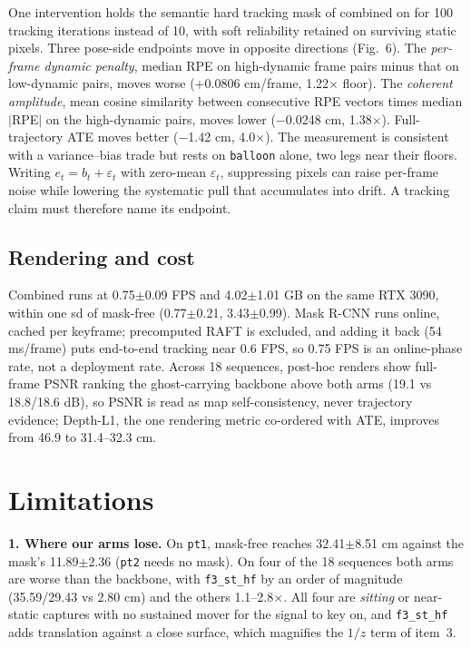 One intervention holds the semantic hard tracking mask of combined on for 100 tracking iterations instead of 10, with soft reliability retained on surviving static pixels. Three pose-side endpoints move in opposite directions (Fig.~6). The \emph{per-frame dynamic penalty}, median RPE on high-dynamic frame pairs minus that on low-dynamic pairs, moves worse (+0.0806 cm/frame, 1.22$\times$ floor). The \emph{coherent amplitude}, mean cosine similarity between consecutive RPE vectors times median $|$RPE$|$ on the high-dynamic pairs, moves lower ($-$0.0248 cm, 1.38$\times$). Full-trajectory ATE moves better ($-$1.42 cm, 4.0$\times$). The measurement is consistent with a variance--bias trade but rests on \texttt{balloon} alone, two legs near their floors. Writing $e_t=b_t+\varepsilon_t$ with zero-mean $\varepsilon_t$, suppressing pixels can raise per-frame noise while lowering the systematic pull that accumulates into drift. A tracking claim must therefore name its endpoint.


\subsection{Rendering and cost}


Combined runs at 0.75$\pm$0.09 FPS and 4.02$\pm$1.01 GB on the same RTX 3090, within one sd of mask-free (0.77$\pm$0.21, 3.43$\pm$0.99). Mask R-CNN runs online, cached per keyframe; precomputed RAFT is excluded, and adding it back (54 ms/frame) puts end-to-end tracking near 0.6 FPS, so 0.75 FPS is an online-phase rate, not a deployment rate. Across 18 sequences, post-hoc renders show full-frame PSNR ranking the ghost-carrying backbone above both arms (19.1 vs 18.8/18.6 dB), so PSNR is read as map self-consistency, never trajectory evidence; Depth-L1, the one rendering metric co-ordered with ATE, improves from 46.9 to 31.4--32.3 cm.




\section{Limitations}


\textbf{1. Where our arms lose.} On \texttt{pt1}, mask-free reaches 32.41$\pm$8.51 cm against the mask's 11.89$\pm$2.36 (\texttt{pt2} needs no mask). On four of the 18 sequences both arms are worse than the backbone, with \texttt{f3\_st\_hf} by an order of magnitude (35.59/29.43 vs 2.80 cm) and the others 1.1--2.8$\times$. All four are \emph{sitting} or near-static captures with no sustained mover for the signal to key on, and \texttt{f3\_st\_hf} adds translation against a close surface, which magnifies the $1/z$ term of item~3.


